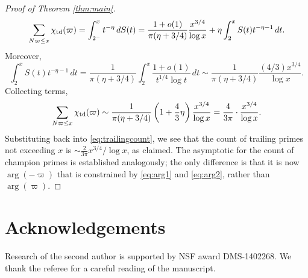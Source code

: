 \documentclass[12pt]{amsart}
\theoremstyle{remark}
\begin{document}
\begin{proof}[Proof of Theorem \ref{thm:main}]
\[ \sum_{N\varpi \le x} \chi_{\mathrm{td}}(\varpi) = \int_{2^{-}}^{x} t^{-\eta}\, dS(t) =  \frac{1+o(1)}{\pi(\eta+3/4)} \frac{x^{3/4}}{\log{x}} +\eta \int_{2}^{x} S(t) t^{-\eta-1}\, dt. \]
Moreover, 
\[ \int_{2}^{x} S(t) t^{-\eta-1}\, dt = \frac{1}{\pi(\eta+3/4)} \int_{2}^{x}\frac{1+o(1)}{t^{1/4}\log{t}}\, dt \sim \frac{1}{\pi(\eta+3/4)} \frac{(4/3)x^{3/4}}{\log{x}} .\]
Collecting terms, \[ \sum_{N\varpi \le x} \chi_{\mathrm{td}}(\varpi) \sim \frac{1}{\pi(\eta+3/4)} \left(1 + \frac{4}{3}\eta\right) \frac{x^{3/4}}{\log{x}} = \frac{4}{3\pi} \cdot \frac{x^{3/4}}{\log{x}}. \]
Substituting back into \eqref{eq:trailingcount}, we see that the count of trailing primes not exceeding $x$ is $\sim \frac{2}{3\pi} x^{3/4}/\log{x}$, as claimed. The asymptotic for the count of champion primes is established analogously; the only difference is that it is now $\arg(-\varpi)$ that is constrained by \eqref{eq:arg1} and \eqref{eq:arg2}, rather than $\arg(\varpi)$.
\end{proof}

\section*{Acknowledgements}
Research of the second author is supported by NSF award DMS-1402268. We thank the referee for a careful reading of the manuscript.



\end{document}
